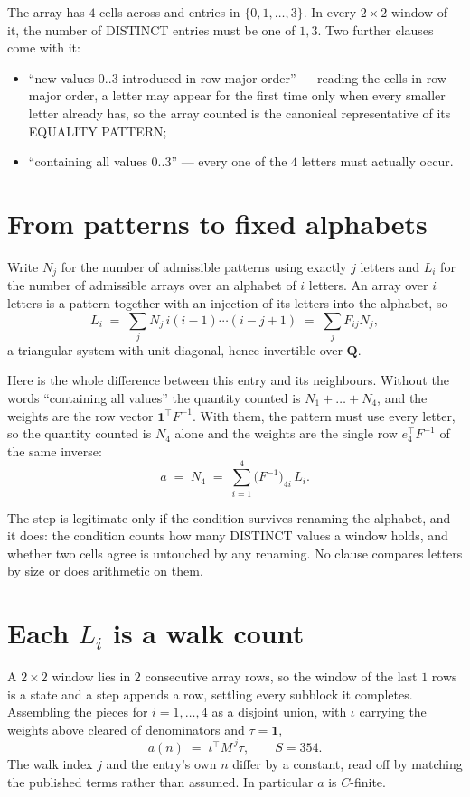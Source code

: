 \documentclass[11pt,a4paper]{article}
\theoremstyle{plain}
\theoremstyle{definition}
\begin{document}
The array has $4$ cells across and entries in $\{0,1,\dots,3\}$. In every
$2\times2$ window of it, the number of DISTINCT entries must be one of $1, 3$. Two
further clauses come with it:

\begin{itemize}
\item ``new values $0..3$ introduced in row major order'' --- reading the cells in row major
order, a letter may appear for the first time only when every smaller letter already has, so
the array counted is the canonical representative of its EQUALITY PATTERN;
\item ``containing all values $0..3$'' --- every one of the $4$ letters must actually
occur.
\end{itemize}


\section{From patterns to fixed alphabets}

Write $N_j$ for the number of admissible patterns using exactly $j$ letters and $L_i$ for the
number of admissible arrays over an alphabet of $i$ letters. An array over $i$ letters is a
pattern together with an injection of its letters into the alphabet, so
\[
L_i\;=\;\sum_{j} N_j\,i(i-1)\cdots(i-j+1)\;=\;\sum_j F_{ij}N_j ,
\]
a triangular system with unit diagonal, hence invertible over $\mathbf{Q}$.

Here is the whole difference between this entry and its neighbours. Without the words
``containing all values'' the quantity counted is $N_1+\dots+N_{4}$, and the weights are
the row vector $\mathbf{1}^{\!\top}F^{-1}$. With them, the pattern must use every letter,
so the quantity counted is $N_{4}$ alone and the weights are the single row
$e_{4}^{\!\top}F^{-1}$ of the same inverse:
\[
a\;=\;N_{4}\;=\;\sum_{i=1}^{4}\bigl(F^{-1}\bigr)_{4i}\,L_i .
\]

The step is legitimate only if the condition survives renaming the alphabet, and it does: the
condition counts how many DISTINCT values a window holds, and whether two cells agree is
untouched by any renaming. No clause compares letters by size or does arithmetic on them.

\section{Each $L_i$ is a walk count}

A $2\times2$ window lies in $2$ consecutive array rows, so the window of the last
$1$ rows is a state and a step appends a row, settling every subblock it completes.
Assembling the pieces for $i=1,\dots,4$ as a disjoint union, with $\iota$ carrying the
weights above cleared of denominators and $\tau=\mathbf{1}$,
\[
a(n)\;=\;\iota^{\!\top}M^{\,j}\tau ,\qquad S=354.
\]
The walk index $j$ and the entry's own $n$ differ by a constant, read off by matching the
published terms rather than assumed. In particular $a$ is $C$-finite.
\end{document}
